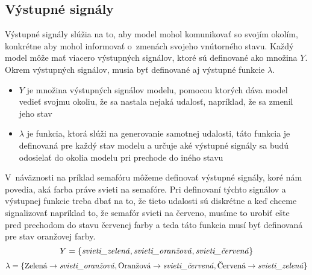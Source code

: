 \subsection*{Výstupné signály}
Výstupné signály slúžia na to, aby model mohol komunikovať so svojím okolím, konkrétne aby mohol informovať o~zmenách svojeho vnútorného stavu.
Každý model môže mať viacero výstupných signálov, ktoré sú definované ako množina $Y$.
Okrem výstupných signálov, musia byť definované aj výstupné funkcie $\lambda$.
\begin{itemize}
  \item $Y$ je množina výstupných signálov modelu, pomocou ktorých dáva model vedieť svojmu okoliu, že sa nastala nejaká udalosť, napríklad, že sa zmenil jeho stav
  \item $\lambda$ je funkcia, ktorá slúži na generovanie samotnej udalosti, táto funkcia je definovaná pre každý stav modelu a určuje aké výstupné signály sa budú odosielať do okolia modelu pri prechode do iného stavu
\end{itemize}
V~náväznosti na príklad semafóru môžeme definovať výstupné signály, koré nám povedia, aká farba práve svieti na semafóre.
Pri definovaní týchto signálov a výstupnej funkcie treba dbať na to, že tieto udalosti sú diskrétne a keď chceme signalizovať napríklad to, že semafór svieti na červeno, musíme to urobiť ešte pred prechodom do stavu červenej farby a teda táto funkcia musí byť definovaná pre stav oranžovej farby.
\[Y = \{\text{\textit{svieti\_zelená}}, \text{\textit{svieti\_oranžová}}, \text{\textit{svieti\_červená}} \}\]
\[\lambda = \{ \text{Zelená} \rightarrow \text{\textit{svieti\_oranžová}}, \text{Oranžová} \rightarrow \text{\textit{svieti\_červená}}, \text{Červená} \rightarrow \text{\textit{svieti\_zelená}} \}\]

